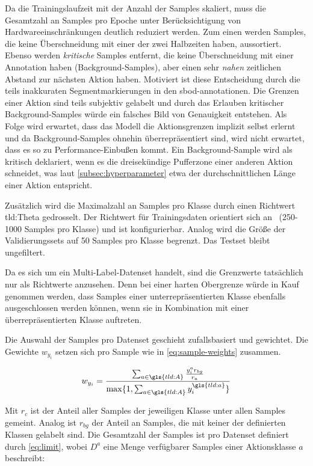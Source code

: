 Da die Trainingslaufzeit mit der Anzahl der Samples skaliert, muss die Gesamtzahl an Samples pro Epoche unter Berücksichtigung von Hardwareeinschränkungen deutlich reduziert werden.
Zum einen werden Samples, die keine Überschneidung mit einer der zwei Halbzeiten haben, aussortiert.
Ebenso werden \emph{kritische} Samples entfernt, die keine Überschneidung mit einer Annotation haben (Background-Samples), aber einen sehr \emph{nahen} zeitlichen Abstand zur nächsten Aktion haben.
Motiviert ist diese Entscheidung durch die teils inakkuraten Segmentmarkierungen in den \gls{sbod}-\gls{annotationen}.
Die Grenzen einer Aktion sind teils subjektiv gelabelt und durch das Erlauben kritischer Background-Samples würde ein falsches Bild von Genauigkeit entstehen.
Als Folge wird erwartet, dass das Modell die Aktionsgrenzen implizit selbst erlernt und da Background-Samples ohnehin überrepräsentiert sind, wird nicht erwartet, dass es so zu Performance-Einbußen kommt.
Ein Background-Sample wird als kritisch deklariert, wenn es die dreisekündige Pufferzone einer anderen Aktion schneidet, was laut \autoref{subsec:hyperparameter} etwa der durchschnittlichen Länge einer Aktion entspricht.

Zusätzlich wird die Maximalzahl an Samples pro Klasse durch einen Richtwert \gls{tld:Theta} gedrosselt.
Der Richtwert für Trainingsdaten orientiert sich an~\cite{Kay17} (250-1000 Samples pro Klasse) und ist konfigurierbar.
Analog wird die Größe der Validierungssets auf 50 Samples pro Klasse begrenzt.
Das Testset bleibt ungefiltert.

Da es sich um ein Multi-Label-Datenset handelt, sind die Grenzwerte tatsächlich nur als Richtwerte anzusehen.
Denn bei einer harten Obergrenze würde in Kauf genommen werden, dass Samples einer unterrepräsentierten Klasse ebenfalls ausgeschlossen werden können, wenn sie in Kombination mit einer überrepräsentierten Klasse auftreten.

Die Auswahl der Samples pro Datenset geschieht zufallsbasiert und gewichtet.
Die Gewichte $w_{y_i}$ setzen sich pro Sample wie in \autoref{eq:sample-weights} zusammen.

\begin{equation}
    \label{eq:sample-weights}
    w_{y_i} = \frac{\sum_{a \in \gls{tld:A}} \frac{y_i^a r_{bg}}{r_a} }{\max \{1, \sum_{a \in \gls{tld:A}} y_i^{\gls{tld:a}}\}}
\end{equation}

Mit $r_{c}$ ist der Anteil aller Samples der jeweiligen Klasse unter allen Samples gemeint.
Analog ist $r_{bg}$ der Anteil an Samples, die mit keiner der definierten Klassen gelabelt sind.
Die Gesamtzahl der Samples ist pro Datenset definiert durch \autoref{eq:limit}, wobei $D^a$ eine Menge verfügbarer Samples einer Aktionsklasse $a$ beschreibt:

